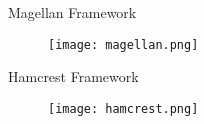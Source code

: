 \begin{frame}{Magellan Framework}
    \centering
    \begin{figure}
      \centering
      \texttt{[image: magellan.png]}
    \end{figure}
\end{frame}

\begin{frame}{Hamcrest Framework}
    \centering
    \begin{figure}
      \centering
      \texttt{[image: hamcrest.png]}
    \end{figure}
\end{frame}
